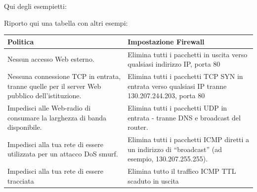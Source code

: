 Qui degli esempietti:


Riporto qui una tabella con altri esempi:
\begin{center}
    \begin{tabularx}{\textwidth}{|X|X|}
        \hline
        \textbf{Politica} & \textbf{Impostazione Firewall} \\
        \hline
        Nessun accesso Web esterno. & Elimina tutti i pacchetti in uscita verso qualsiasi indirizzo IP, porta 80 \\
        \hline
        Nessuna connessione TCP in entrata, tranne quelle per il server Web pubblico dell'istituzione. & Elimina tutti i pacchetti TCP SYN in entrata verso qualsiasi IP tranne 130.207.244.203, porta 80 \\
        \hline
        Impedisci alle Web-radio di consumare la larghezza di banda disponibile. & Elimina tutti i pacchetti UDP in entrata - tranne DNS e broadcast del router. \\
        \hline
        Impedisci alla tua rete di essere utilizzata per un attacco DoS smurf. & Elimina tutti i pacchetti ICMP diretti a un indirizzo di “broadcast” (ad esempio, 130.207.255.255). \\
        \hline
        Impedisci alla tua rete di essere tracciata & Elimina tutto il traffico ICMP TTL scaduto in uscita \\
        \hline
        \end{tabularx}
\end{center}

